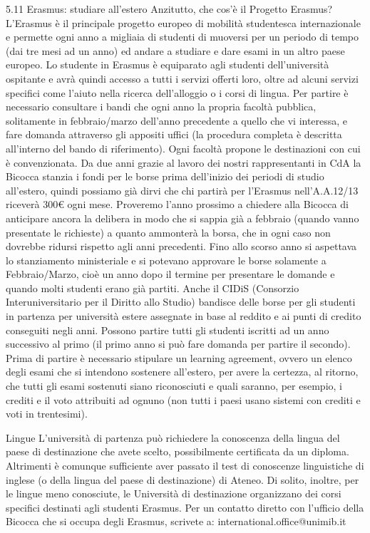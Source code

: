 5.11 Erasmus: studiare all'estero
Anzitutto, che cos'è il Progetto Erasmus? L'Erasmus è il principale progetto europeo di mobilità studentesca internazionale e permette ogni anno a migliaia di studenti di muoversi per un periodo di tempo (dai tre mesi ad un anno) ed andare a studiare e dare esami in un altro paese europeo. Lo studente in Erasmus è equiparato agli studenti dell'università ospitante e avrà quindi accesso a tutti i servizi offerti loro, oltre ad alcuni servizi specifici come l'aiuto nella ricerca dell'alloggio o i corsi di lingua. Per partire è necessario consultare i bandi che ogni anno la propria facoltà pubblica, solitamente in febbraio/marzo dell'anno precedente a quello che vi interessa, e fare domanda attraverso gli appositi uffici (la procedura completa è descritta all'interno del bando di riferimento). 
Ogni facoltà propone le destinazioni con cui è convenzionata. Da due anni grazie al lavoro dei nostri rappresentanti in CdA la Bicocca stanzia i fondi per le borse prima dell'inizio dei periodi di studio all'estero, quindi possiamo già dirvi che chi partirà per l'Erasmus nell'A.A.12/13 riceverà 300€ ogni mese. Proveremo l'anno prossimo a chiedere alla Bicocca di anticipare ancora la delibera in modo che si sappia già a febbraio (quando vanno presentate le richieste) a quanto ammonterà la borsa, che in ogni caso non dovrebbe ridursi rispetto agli anni precedenti. Fino allo scorso anno si aspettava lo stanziamento ministeriale e si potevano approvare le borse solamente a Febbraio/Marzo, cioè un anno dopo il termine per presentare le domande e quando molti studenti erano già partiti. Anche il CIDiS (Consorzio Interuniversitario per il Diritto allo Studio) bandisce delle borse per gli studenti in partenza per università estere assegnate in base al reddito e ai punti di credito conseguiti negli anni. Possono partire tutti gli studenti iscritti ad un anno successivo al primo (il primo anno si può fare domanda per partire il secondo). Prima di partire è necessario stipulare un learning agreement, ovvero un elenco degli esami che si intendono sostenere all'estero, per avere la certezza, al ritorno, che tutti gli esami sostenuti siano riconosciuti e quali saranno, per esempio, i crediti e il voto attribuiti ad ognuno (non tutti i paesi usano sistemi con crediti e voti in trentesimi).

Lingue
L'università di partenza può richiedere la conoscenza della lingua del paese di destinazione che avete scelto, possibilmente certificata da un diploma. Altrimenti è comunque sufficiente aver passato il test di conoscenze linguistiche di inglese (o della lingua del paese di destinazione) di Ateneo. Di solito, inoltre, per le lingue meno conosciute, le Università di destinazione organizzano dei corsi specifici destinati agli studenti Erasmus.
Per un contatto diretto con l'ufficio della Bicocca che si occupa degli Erasmus, scrivete a: international.office@unimib.it

